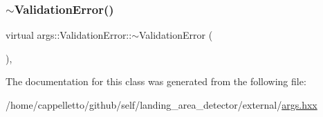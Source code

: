 \subsubsection{\texorpdfstring{$\sim$\+Validation\+Error()}{~ValidationError()}}
{\footnotesize\ttfamily virtual args\+::\+Validation\+Error\+::$\sim$\+Validation\+Error (\begin{DoxyParamCaption}{ }\end{DoxyParamCaption})\hspace{0.3cm}{\ttfamily [inline]}, {\ttfamily [virtual]}}



The documentation for this class was generated from the following file\+:\begin{DoxyCompactItemize}
\item 
/home/cappelletto/github/self/landing\+\_\+area\+\_\+detector/external/\hyperlink{args_8hxx}{args.\+hxx}\end{DoxyCompactItemize}
